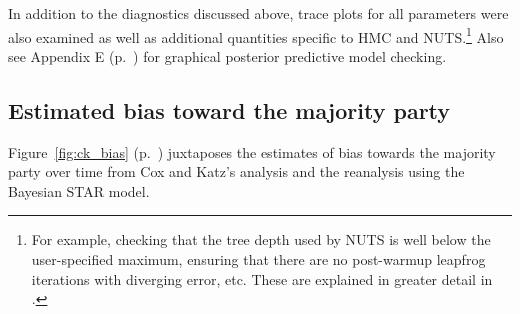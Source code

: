 %
%
%

In addition to the diagnostics discussed above, trace plots for all parameters were also 
examined as well as additional quantities specific to HMC and NUTS.\footnote{For example, 
checking that the tree depth used by NUTS is well below the user-specified maximum, ensuring 
that there are no post-warmup leapfrog iterations with diverging error, etc. These are explained 
in greater detail in .} 
Also see Appendix E (p.~\pageref{AppendixE}) %
for graphical posterior predictive model checking. 


\subsection[Comparing estimates]{Estimated bias toward the majority party}
\label{results}



Figure~\ref{fig:ck_bias} (p.~\pageref{fig:ck_bias}) juxtaposes the estimates of 
bias towards the majority party over time from Cox and Katz's analysis and the reanalysis 
using the Bayesian STAR model.

